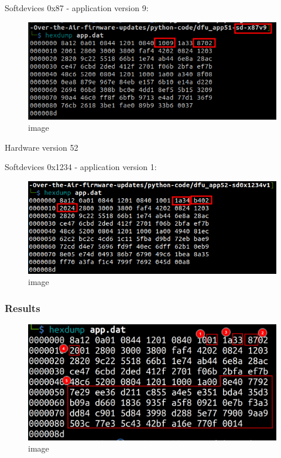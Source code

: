 Softdevices 0x87 - application version 9:

\begin{figure}
\centering
\includegraphics{images/readme/screenshot_21-05-2023_20h38m08.png}
\caption{image}
\end{figure}

Hardware version 52

Softdevices 0x1234 - application version 1:

\begin{figure}
\centering
\includegraphics{images/readme/screenshot_21-05-2023_20h45m54.png}
\caption{image}
\end{figure}

\hypertarget{results}{%
\subsubsection{Results}\label{results}}

\begin{figure}
\centering
\includegraphics{images/readme/screenshot_21-05-2023_20h52m10.png}
\caption{image}
\end{figure}

